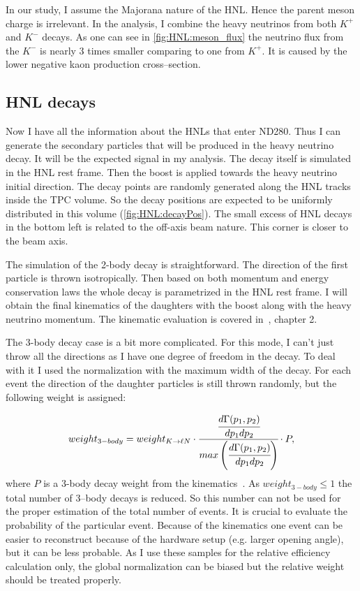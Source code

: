 \documentclass[../main.tex]{subfiles}
\begin{document}
In our study, I assume the Majorana nature of the HNL. Hence the parent meson charge is irrelevant. In the analysis, I combine the heavy neutrinos from both $K^+$ and $K^-$ decays. As one can see in \autoref{fig:HNL:meson_flux} the neutrino flux from the $K^-$ is nearly 3 times smaller comparing to one from $K^+$. It is caused by the lower negative kaon production cross--section.

\subsection{HNL decays}
Now I have all the information about the HNLs that enter ND280. Thus I can generate the secondary particles that will be produced in the heavy neutrino decay. It will be the expected signal in my analysis. The decay itself is simulated in the HNL rest frame. Then the boost is applied towards the heavy neutrino initial direction. The decay points are randomly generated along the  HNL tracks inside the TPC volume. So the decay positions are expected to be uniformly distributed in this volume (\autoref{fig:HNL:decayPos}). The small excess of HNL decays in the bottom left is related to the off-axis beam nature. This corner is closer to the beam axis.

The simulation of the 2-body decay is straightforward. The direction of the first particle is thrown isotropically. Then based on both momentum and energy conservation laws the whole decay is parametrized in the HNL rest frame. I will obtain the final kinematics of the daughters with the boost along with the heavy neutrino momentum. The kinematic evaluation is covered in~\cite{Landau2013}, chapter 2.

The 3-body decay case is a bit more complicated. For this mode, I can't just throw all the directions as I have one degree of freedom in the decay. To deal with it I used the normalization with the maximum width of the decay. For each event the direction of the daughter particles is still thrown randomly, but the following weight is assigned:

\begin{equation}
    weight_{3-body}=weight_{K\rightarrow \ell N}\cdot\cfrac{\cfrac{d\Gamma(p_1,p_2)}{dp_1dp_2}}{max\left(\cfrac{d\Gamma(p_1,p_2)}{dp_1dp_2}\right)}\cdot P,
\end{equation}
where $P$ is a 3-body decay weight from the kinematics~\cite{James1968}. As $weight_{3-body} \le 1$ the total number of 3--body decays is reduced. So this number can not be used for the proper estimation of the total number of events. It is crucial to evaluate the probability of the particular event. Because of the kinematics one event can be easier to reconstruct because of the hardware setup (e.g. larger opening angle), but it can be less probable. As I use these samples for the relative efficiency calculation only, the global normalization can be biased but the relative weight should be treated properly.
\end{document}
